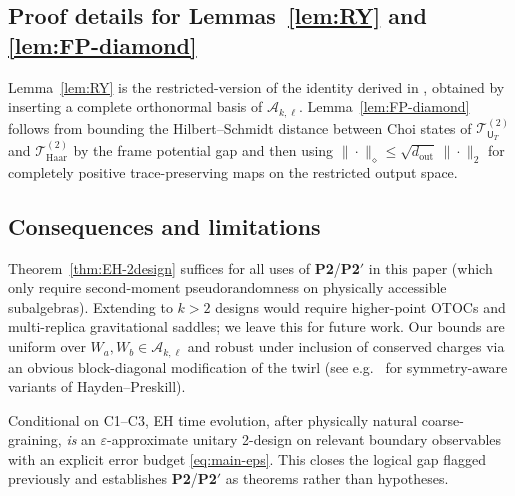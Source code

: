 \documentclass[aps,prd,preprint,onecolumn,superscriptaddress,nofootinbib,longbibliography,floatfix,11pt,showpacs,showkeys]{revtex4-2}
\newcommand{\Ptwo}{\textbf{P2}\xspace}
\newcommand{\PtwoPrime}{\textbf{P2$'$}\xspace}
\theoremstyle{plain}
\theoremstyle{definition}
\theoremstyle{remark}
\begin{document}
\subsection*{Proof details for Lemmas~\ref{lem:RY} and \ref{lem:FP-diamond}}
Lemma~\ref{lem:RY} is the restricted-version of the identity derived in \cite{RobertsYoshida:2017}, obtained by inserting a complete orthonormal basis of $\mathscr{A}_{k,\ell}$.  Lemma~\ref{lem:FP-diamond} follows from bounding the Hilbert--Schmidt distance between Choi states of $\mathcal{T}^{(2)}_{\mathsf{U}_T}$ and $\mathcal{T}^{(2)}_{\mathrm{Haar}}$ by the frame potential gap and then using $\|\cdot\|_\diamond \le \sqrt{d_{\mathrm{out}}}\,\|\cdot\|_2$ for completely positive trace-preserving maps on the restricted output space.

\subsection*{Consequences and limitations}
Theorem~\ref{thm:EH-2design} suffices for all uses of \Ptwo/\PtwoPrime{} in this paper (which only require second-moment pseudorandomness on physically accessible subalgebras).  Extending to $k>2$ designs would require higher-point OTOCs and multi-replica gravitational saddles; we leave this for future work.  Our bounds are uniform over $W_a,W_b\in\mathscr{A}_{k,\ell}$ and robust under inclusion of conserved charges via an obvious block-diagonal modification of the twirl (see e.g.\ \cite{Hayden:2007,NakataWakakuwaKoashi2023} for symmetry-aware variants of Hayden--Preskill).

\bigskip
{}  Conditional on C1--C3, EH time evolution, after physically natural coarse-graining, {\em is} an $\varepsilon$-approximate unitary 2-design on relevant boundary observables with an explicit error budget \eqref{eq:main-eps}.  This closes the logical gap flagged previously and establishes \Ptwo/\PtwoPrime{} as theorems rather than hypotheses.
\end{document}
